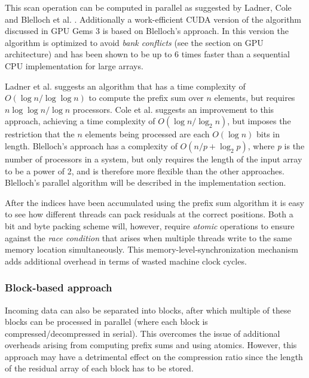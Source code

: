  This scan operation can be computed in parallel as suggested by Ladner, Cole and Blelloch et al. \cite{ladner1980parallel,cole1989faster,blelloch1990prefix}.
 Additionally a work-efficient CUDA version of the algorithm discussed in GPU Gems 3 \cite{harris2007parallel} is based on Blelloch's approach. In this version the algorithm is optimized 
 to avoid \textit{bank conflicts} (see the section on GPU architecture) and has been shown to be up to 6 times faster than a sequential CPU implementation for large arrays.
 
 Ladner et al. suggests an algorithm that has a time complexity of $O(\log{n}/\log{\log{n}})$ to compute the prefix sum over $n$ elements, but requires $n\log\log{n}/\log{n}$ processors. 
 Cole et al. suggests an improvement to this approach, achieving a time complexity of $O(\log{n}/\log_2{n})$, but imposes the restriction that the $n$ elements being processed are each $O(\log{n})$ bits in length.
 Blelloch's approach has a complexity of $O(n/p + \log_2{p})$, where \textit{p} is the number of processors in a system, but only requires the length of the input array to be a power of 
 2, and is therefore more flexible than the other approaches. Blelloch's parallel algorithm will be described in the implementation section.
 
 After the indices have been accumulated using the prefix sum algorithm it is easy to see how different threads can pack residuals at the correct positions. Both a bit and byte
 packing scheme will, however, require \textit{atomic} operations to ensure against the \textit{race condition} that arises when multiple threads write to the same memory 
 location simultaneously. This memory-level-synchronization mechanism adds additional overhead in terms of wasted machine clock cycles.
 \subsubsection{Block-based approach}
 Incoming data can also be separated into blocks, after which multiple of these blocks can be processed in parallel (where each block is compressed/decompressed in serial). This overcomes the issue of 
 additional overheads arising from computing prefix sums and using atomics. However, this approach may have a detrimental effect on the compression ratio since the length of the residual array of each block 
 has to be stored.
